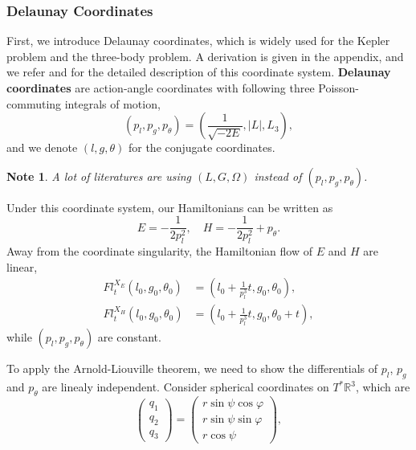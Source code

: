\documentclass{amsart}
\newcommand{\R}{\mathbb{R}}
\newcommand{\vp}{\varphi}
\newtheorem{note}[thm]{Note}
\begin{document}
\subsubsection*{Delaunay Coordinates}
First, we introduce Delaunay coordinates, which is widely used for the Kepler problem and the three-body problem.
A derivation is given in the appendix, and we refer \cite{Poincare_87} and \cite{Chenciner_89} for the detailed description of this coordinate system.
\textbf{Delaunay coordinates} are action-angle coordinates with following three Poisson-commuting integrals of motion,
	$$
	(p_l,p_g,p_\theta)=\left(\frac{1}{\sqrt{-2E}},|L|,L_3\right),
	$$
and we denote $(l,g,\theta)$ for the conjugate coordinates.
\begin{note}\rm
	A lot of literatures are using $(L,G,\Omega)$ instead of $(p_l,p_g,p_\theta)$.
\end{note}
Under this coordinate system, our Hamiltonians can be written as
	$$
	E=-\frac{1}{2p_l^2},\quad H=-\frac{1}{2p_l^2} + p_\theta.
	$$
Away from the coordinate singularity, the Hamiltonian flow of $E$ and $H$ are linear,
$$
\begin{aligned}
Fl^{X_E}_t(l_0,g_0,\theta_0)&= \left(l_0 + \frac{1}{p_l^3}t,g_0,\theta_0\right),\\
Fl^{X_H}_t(l_0,g_0,\theta_0)&= \left(l_0 + \frac{1}{p_l^3}t,g_0,\theta_0+t\right),
\end{aligned}
$$
while $(p_l,p_g,p_\theta)$ are constant.

To apply the Arnold-Liouville theorem, we need to show the differentials of $p_l$, $p_g$ and $p_\theta$ are linealy independent.
Consider spherical coordinates on $T^*\R^3$, which are
	$$
	\begin{pmatrix}
		q_1\\
		q_2\\
		q_3
	\end{pmatrix}
	=
	\begin{pmatrix}
		r \sin\psi \cos \vp\\
		r \sin \psi \sin \vp\\
		r \cos \psi
	\end{pmatrix},
	$$
	
\end{document}
